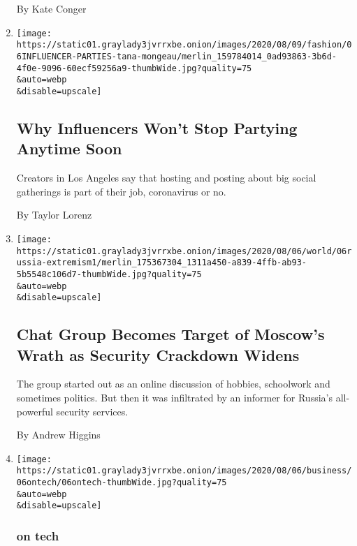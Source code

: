 \begin{enumerate}
  By Kate Conger
\item
  \href{/2020/08/06/style/influencer-parties-jake-paul-tana-mongeau-thomas-petrou-hype-house.html}{}

  \texttt{[image: https://static01.graylady3jvrrxbe.onion/images/2020/08/09/fashion/06INFLUENCER-PARTIES-tana-mongeau/merlin\_159784014\_0ad93863-3b6d-4f0e-9096-60ecf59256a9-thumbWide.jpg?quality=75\\\&auto=webp\\\&disable=upscale]}

  \hypertarget{why-influencers-wont-stop-partying-anytime-soon}{%
  \subsection{Why Influencers Won't Stop Partying Anytime
  Soon}\label{why-influencers-wont-stop-partying-anytime-soon}}

  Creators in Los Angeles say that hosting and posting about big social
  gatherings is part of their job, coronavirus or no.

  By Taylor Lorenz
\item
  \href{/2020/08/06/world/europe/russia-extremisim-chat-group-sentence.html}{}

  \texttt{[image: https://static01.graylady3jvrrxbe.onion/images/2020/08/06/world/06russia-extremism1/merlin\_175367304\_1311a450-a839-4ffb-ab93-5b5548c106d7-thumbWide.jpg?quality=75\\\&auto=webp\\\&disable=upscale]}

  \hypertarget{chat-group-becomes-target-of-moscows-wrath-as-security-crackdown-widens}{%
  \subsection{Chat Group Becomes Target of Moscow's Wrath as Security
  Crackdown
  Widens}\label{chat-group-becomes-target-of-moscows-wrath-as-security-crackdown-widens}}

  The group started out as an online discussion of hobbies, schoolwork
  and sometimes politics. But then it was infiltrated by an informer for
  Russia's all-powerful security services.

  By Andrew Higgins
\item
  \href{/2020/08/06/technology/the-cult-of-the-tech-genius.html}{}

  \texttt{[image: https://static01.graylady3jvrrxbe.onion/images/2020/08/06/business/06ontech/06ontech-thumbWide.jpg?quality=75\\\&auto=webp\\\&disable=upscale]}

  \hypertarget{on-tech-1}{%
  \subsubsection{on tech}\label{on-tech-1}}


\end{enumerate}
